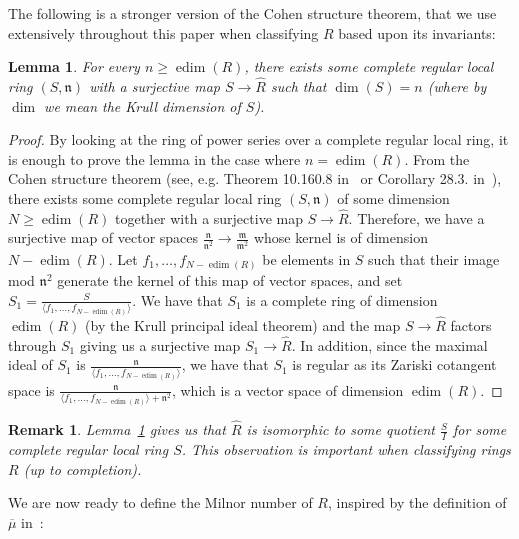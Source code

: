 \documentclass{article}
\newtheorem{lemma}[theorem]{Lemma}
\newtheorem{remark}[theorem]{Remark}
\DeclareMathOperator{\edim}{edim}
\numberwithin{theorem}{section}
\begin{document}
The following is a stronger version of the Cohen structure theorem, that we use extensively throughout this paper when classifying $R$ based upon its invariants: 

\begin{lemma}\label{lem:edim_CST}
    For every $n \geq \edim(R)$, there exists some complete regular local ring $(S, \mathfrak{n})$ with a surjective map $S \to \hat{R}$ such that $\dim(S)=n$ (where by $\dim$ we mean the Krull dimension of $S$).
\end{lemma}

\begin{proof}
    By looking at the ring of power series over a complete regular local ring, it is enough to prove the lemma in the case where $n=\edim(R)$. From the Cohen structure theorem (see, e.g. Theorem 10.160.8 in~\cite{stacks-project} or Corollary 28.3. in~\cite{matsumura1970commutative}), there exists some complete regular local ring $(S, \mathfrak{n})$ of some dimension $N\geq \edim(R)$ together with a surjective map $S \to \hat{R}$. Therefore, we have a surjective map of vector spaces $\frac{\mathfrak{n}}{\mathfrak{n}^2} \to \frac{\mathfrak{m}}{\mathfrak{m}^2}$ whose kernel is of dimension $N-\edim(R)$. Let $f_1, \dots, f_{N-\edim(R)}$ be elements in $S$ such that their image mod $\mathfrak{n}^2$ generate the kernel of this map of vector spaces, and set $S_1=\frac{S}{\langle f_1, \dots, f_{N-\edim(R)} \rangle}$. We have that $S_1$ is a complete ring of dimension $\edim(R)$ (by the Krull principal ideal theorem) and the map $S \to \hat{R}$ factors through $S_1$ giving us a surjective map $S_1 \to \hat{R}$. In addition, since the maximal ideal of $S_1$ is $\frac{\mathfrak{n}}{\langle f_1, \dots, f_{N-\edim(R)} \rangle}$, we have that $S_1$ is regular as its Zariski cotangent space is $\frac{\mathfrak{n}}{\langle f_1, \dots, f_{N-\edim(R)} \rangle + \mathfrak{n}^2}$, which is a vector space of dimension $\edim(R)$. 
\end{proof}

\begin{remark}
    \textup{Lemma~\ref{lem:edim_CST} gives us that $\hat{R}$ is isomorphic to some quotient $\frac{S}{I}$ for some complete regular local ring $S$. This observation is important when classifying rings $R$ (up to completion). }
\end{remark}

    We are now ready to define the Milnor number of $R$, inspired by the definition of $\overline{\mu}$ in~\cite{barroso2022note}:
\end{document}
